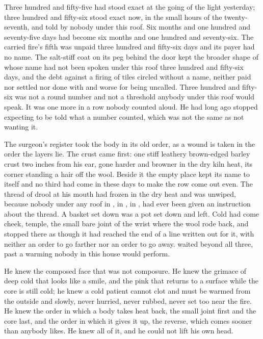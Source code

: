 Three hundred and fifty-five had stood exact at the going of the light yesterday; three hundred and fifty-six stood exact now, in the small hours of the twenty-seventh, and told by nobody under this roof. Six months and one hundred and seventy-five days had become six months and one hundred and seventy-six. The carried fire's fifth was unpaid three hundred and fifty-six days and its payer had no name. The salt-stiff coat on its peg behind the door kept the broader shape of  whose name had not been spoken under this roof three hundred and fifty-six days, and the debt against a firing of tiles circled without a name, neither paid nor settled nor done with and worse for being uncalled. Three hundred and fifty-six was not a round number and not a threshold anybody under this roof would speak. It was one more in a row nobody counted aloud. He had long ago stopped expecting to be told what a number counted, which was not the same as not wanting it.

The surgeon's register took the body in its old order, as a wound is taken in the order the layers lie. The crust came first: one stiff leathery brown-edged barley crust two inches from his ear, gone harder and browner in the dry kiln heat, its corner standing a hair off the wool. Beside it the empty place kept its name to itself and no third had come in these days to make the row come out even. The thread of drool at his mouth had frozen in the dry heat and was unwiped, because nobody under any roof in , in , in , had ever been given an instruction about the thread. A basket set down was a pot set down and left. Cold had come cheek, temple, the small bare joint of the wrist where the wool rode back, and stopped there as though it had reached the end of a line written out for it, with neither an order to go farther nor an order to go away.  waited beyond all three, past a warming nobody in this house would perform.

He knew the composed face that was not composure. He knew the grimace of deep cold that looks like a smile, and the pink that returns to a surface while the core is still cold; he knew a cold patient cannot clot and must be warmed from the outside and slowly, never hurried, never rubbed, never set too near the fire. He knew the order in which a body takes heat back, the small joint first and the core last, and the order in which it gives it up, the reverse, which comes sooner than anybody likes. He knew all of it, and he could not lift his own head.

